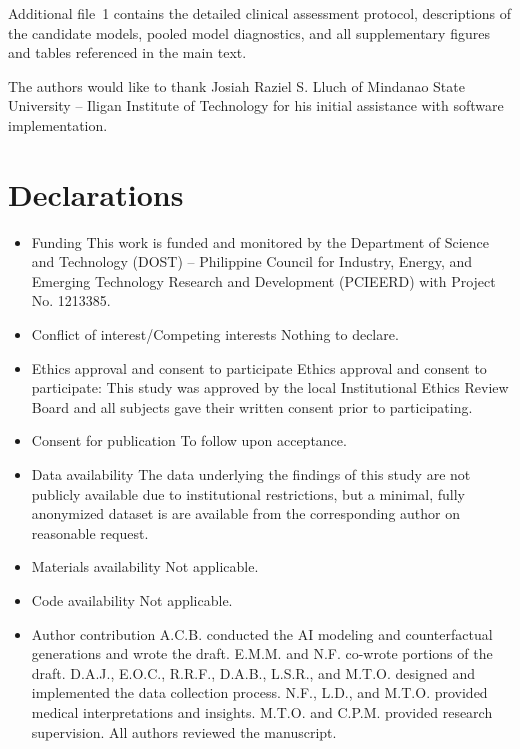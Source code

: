 \documentclass[pdflatex,sn-mathphys-num]{sn-jnl}%
\theoremstyle{thmstyleone}%
\theoremstyle{thmstyletwo}%
\theoremstyle{thmstylethree}%
\begin{document}
\clearpage

\backmatter


Additional file~1 contains the detailed clinical assessment protocol, descriptions of
the candidate models, pooled model diagnostics, and all supplementary figures and tables referenced
in the main text.

The authors would like to thank Josiah Raziel S. Lluch of Mindanao State University -- Iligan Institute of Technology for his initial assistance with software implementation. 

\section*{Declarations}


\begin{itemize}
\item Funding
This work is funded and monitored by the Department of Science and Technology (DOST) -- Philippine Council for Industry, Energy, and Emerging Technology Research and Development (PCIEERD) with Project No. 1213385.
\item Conflict of interest/Competing interests
Nothing to declare.
\item Ethics approval and consent to participate
Ethics approval and consent to participate: This study was approved by the local Institutional Ethics Review Board and all subjects gave their written consent prior to participating.
\item Consent for publication
To follow upon acceptance.
\item Data availability 
The data underlying the findings of this study are not publicly available due to institutional restrictions, but a minimal, fully anonymized dataset is are available from the corresponding author on reasonable request.
\item Materials availability
Not applicable.
\item Code availability 
Not applicable.
\item Author contribution
 A.C.B. conducted the AI modeling and counterfactual generations and wrote the draft. E.M.M. and N.F. co-wrote portions of the draft. D.A.J., E.O.C., R.R.F., D.A.B., L.S.R., and M.T.O. designed and implemented the data collection process. N.F., L.D., and M.T.O. provided medical interpretations and insights. M.T.O. and C.P.M. provided research supervision. All authors reviewed the manuscript.
\end{itemize}
\end{document}
